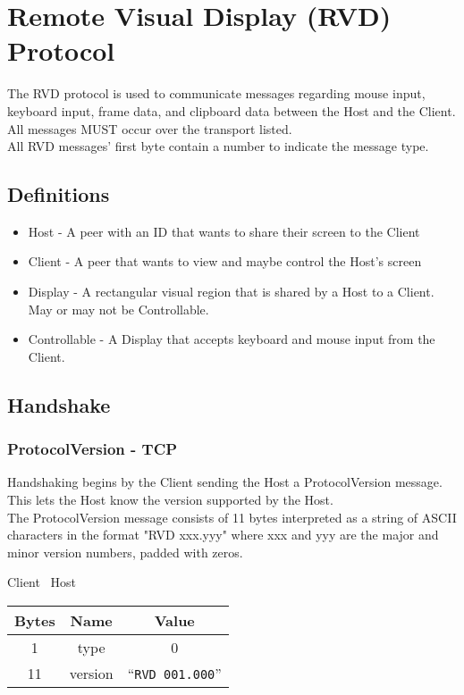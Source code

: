 \section{Remote Visual Display (RVD) Protocol}

The RVD protocol is used to communicate messages regarding mouse input, keyboard input, frame data, and clipboard
data between the
Host and the Client.\\

All messages MUST occur over the transport listed.\\

All RVD messages' first byte contain a number to indicate the message type. \\

\subsection{Definitions}

\begin{itemize}
    \item Host - A peer with an ID that wants to share their screen to the Client
    \item Client - A peer that wants to view and maybe control the Host's screen
    \item Display - A rectangular visual region that is shared by a Host to a Client. May or may not be
    Controllable.
    \item Controllable - A Display that accepts keyboard and mouse input from the Client.
\end{itemize}

\subsection{Handshake}

\subsubsection{ProtocolVersion - TCP}
Handshaking begins by the Client sending the Host a ProtocolVersion message. This lets the Host know the
version supported by the Host.\\

The ProtocolVersion message consists of 11 bytes interpreted as a string of ASCII characters in the format
"RVD xxx.yyy" where xxx and yyy are the major and minor version numbers, padded with zeros.

\begin{center}
    Client \textrightarrow\ Host\\
    \begin{tabular}{|c|c|c|}
        \hline
        \textbf{Bytes} & \textbf{Name} & \textbf{Value}           \\
        \hline
        1              & type          & 0                        \\
        \hline
        11             & version       & ``\texttt{RVD 001.000}'' \\
        \hline
    \end{tabular}
\end{center}

